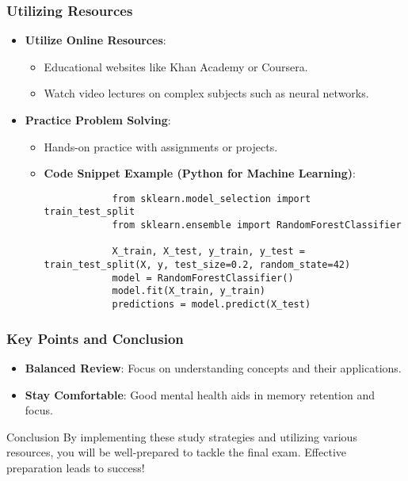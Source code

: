 \documentclass[aspectratio=169]{beamer}
\begin{document}
\begin{frame}[fragile]
    \frametitle{Utilizing Resources}
    \begin{itemize}
        \item \textbf{Utilize Online Resources}:
        \begin{itemize}
            \item Educational websites like Khan Academy or Coursera.
            \item Watch video lectures on complex subjects such as neural networks.
        \end{itemize}
        
        \item \textbf{Practice Problem Solving}:
        \begin{itemize}
            \item Hands-on practice with assignments or projects.
            \item \textbf{Code Snippet Example (Python for Machine Learning)}:
            \begin{lstlisting}
            from sklearn.model_selection import train_test_split
            from sklearn.ensemble import RandomForestClassifier

            X_train, X_test, y_train, y_test = train_test_split(X, y, test_size=0.2, random_state=42)
            model = RandomForestClassifier()
            model.fit(X_train, y_train)
            predictions = model.predict(X_test)
            \end{lstlisting}
        \end{itemize}
    \end{itemize}
\end{frame}

\begin{frame}
    \frametitle{Key Points and Conclusion}
    \begin{itemize}
        \item \textbf{Balanced Review}: Focus on understanding concepts and their applications.
        \item \textbf{Stay Comfortable}: Good mental health aids in memory retention and focus.
    \end{itemize}
    \begin{block}{Conclusion}
        By implementing these study strategies and utilizing various resources, you will be well-prepared to tackle the final exam. Effective preparation leads to success!
    \end{block}
\end{frame}
\end{document}
